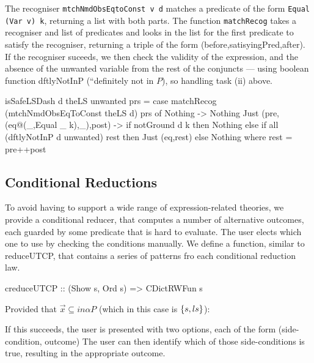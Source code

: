 The recogniser \texttt{mtchNmdObsEqtoConst v d} matches a predicate of the form
\texttt{Equal (Var v) k}, returning a list with both parts.
The function \texttt{matchRecog} takes a recogniser and list of predicates
and looks in the list for the first predicate to satisfy
the recogniser, returning a triple of the form
(before,satisyingPred,after).
If the recogniser suceeds,
we then check the validity of the expression,
and the absence of the unwanted variable from the
rest of the conjuncts --- using boolean function
 dftlyNotInP (``definitely not in $P$),
 so handling task (ii) above.
\begin{code}
isSafeLSDash d theLS unwanted prs
 = case matchRecog (mtchNmdObsEqToConst theLS d) prs of
    Nothing -> Nothing
    Just (pre,(eq@(_,Equal _ k),_),post) ->
     if notGround d k
      then Nothing
      else if all (dftlyNotInP d unwanted) rest
       then Just (eq,rest)
       else Nothing
     where rest = pre++post
\end{code}

\subsection{Conditional Reductions}

To avoid having to support a wide range of expression-related theories,
we provide a conditional reducer, that computes
a number of alternative outcomes, each guarded by some predicate
that is hard to evaluate.
The user elects which one to use by checking the conditions manually.
We define a function, similar to reduceUTCP,
that contains a series of patterns fro each conditional reduction law.
\begin{code}
creduceUTCP :: (Show s, Ord s) => CDictRWFun s
\end{code}
Provided that $\vec x \subseteq in\alpha P$
 (which in this case is $\{{s,ls}\}$):
If this succeeds, the user is presented with two options,
each of the form (side-condition, outcome)
The user can then identify which of those side-conditions is true,
resulting in the appropriate outcome.

